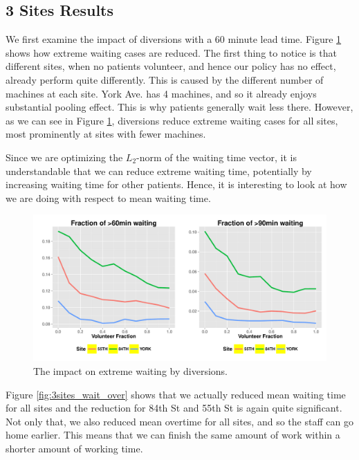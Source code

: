\subsection{3 Sites Results}

We first examine the impact of diversions with a 60 minute
lead time. Figure \ref{fig:3sites_extreme} shows how extreme
waiting cases are reduced. The first thing to notice is that
different sites, when no patients volunteer, and hence our
policy has no effect, already perform quite differently. This is caused by
the different number of machines at each site. York Ave. has 4 machines,
and so it already enjoys substantial pooling effect. This is why patients
generally wait less there. However, as we can see in Figure \ref{fig:3sites_extreme},
diversions reduce extreme waiting cases for all sites, most
prominently at sites with fewer machines.

Since we are optimizing the $L_2$-norm of the waiting time vector,
it is understandable that we can reduce extreme waiting time,
potentially by increasing waiting time for other patients.
Hence, it is interesting to look at how we are doing with respect to mean waiting
time.

\begin{figure}[htp]
\centering
\includegraphics[width=.95\textwidth]{chap3/numeric/pic/3sites_extreme}
\caption{The impact on extreme waiting by diversions.}
\label{fig:3sites_extreme}
\end{figure}

Figure \ref{fig:3sites_wait_over} shows that we actually
reduced mean waiting time for all sites and the reduction
for 84th St and 55th St is again quite significant.
Not only that, we also reduced mean overtime for all sites, and so
the staff can go home earlier. This means that we can finish
the same amount of work within a shorter amount of working time.


